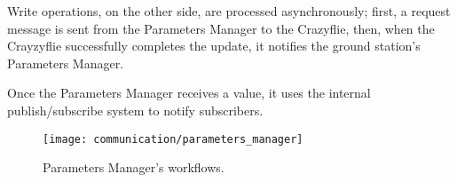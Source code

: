Write operations, on the other side, are processed asynchronously; first, a request message is sent from the Parameters Manager to the Crazyflie,
then, when the Crayzyflie successfully completes the update, it notifies the ground station's Parameters Manager.

Once the Parameters Manager receives a value, it uses the internal publish/subscribe system to notify subscribers.  

\begin{figure}[h]
    \centering
    \texttt{[image: communication/parameters\_manager]}
    \caption{Parameters Manager's workflows.}\label{fig:parameters_manager}
\end{figure}

